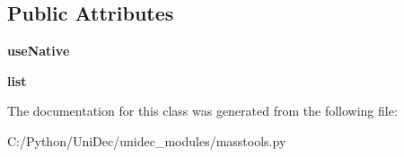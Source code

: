 \subsection*{Public Attributes}
\begin{DoxyCompactItemize}
\item 
\hypertarget{class_uni_dec_1_1unidec__modules_1_1masstools_1_1_test_list_ctrl_panel_match_a2e6c4e7bd50050c8ea28dc06d893c216}{}{\bfseries use\+Native}\label{class_uni_dec_1_1unidec__modules_1_1masstools_1_1_test_list_ctrl_panel_match_a2e6c4e7bd50050c8ea28dc06d893c216}

\item 
\hypertarget{class_uni_dec_1_1unidec__modules_1_1masstools_1_1_test_list_ctrl_panel_match_afb4bb3b63944bc2e1bc1bda06b7c57bb}{}{\bfseries list}\label{class_uni_dec_1_1unidec__modules_1_1masstools_1_1_test_list_ctrl_panel_match_afb4bb3b63944bc2e1bc1bda06b7c57bb}

\end{DoxyCompactItemize}


The documentation for this class was generated from the following file\+:\begin{DoxyCompactItemize}
\item 
C\+:/\+Python/\+Uni\+Dec/unidec\+\_\+modules/masstools.\+py\end{DoxyCompactItemize}
